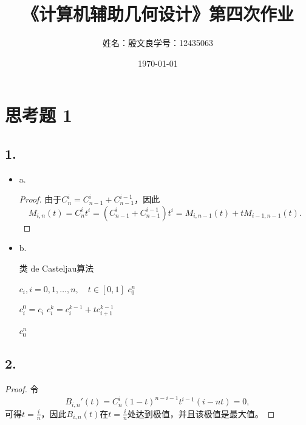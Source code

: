 \documentclass[utf8]{ctexart}
\title{《计算机辅助几何设计》第四次作业}
\author{姓名：殷文良\qquad 学号：12435063}
\date{\today}
\begin{document}
\maketitle
{}

\section*{思考题 1}
\subsection*{1.}
\begin{itemize}
    \item a.
    \begin{proof}
        由于$C_n^i = C_{n-1}^i + C_{n-1}^{i-1}$，因此
        \begin{equation*}
            M_{i,n}(t) = C_n^it^i
            = (C_{n-1}^i + C_{n-1}^{i-1})t^i
            = M_{i,n-1}(t) + tM_{i-1,n-1}(t).
        \end{equation*}
    \end{proof}
    \item b.
    \begin{algorithm}[H]
        \caption{类 de Casteljau算法}
        \label{alg1}
        \renewcommand{\algorithmicrequire}{\textbf{Input:}}
        \renewcommand{\algorithmicensure}{\textbf{Output:}}
        \begin{algorithmic}[1]
            \REQUIRE $c_i,i=0,1,\dots,n,\quad t\in[0,1]$
            \ENSURE $c_0^n$

            \STATE $c_i^0=c_i$
            \ENDFOR
            \STATE $c_i^k = c_{i}^{k-1} + tc_{i+1}^{k-1}$
            \ENDFOR
            \ENDFOR

            \RETURN $c_0^n$
        \end{algorithmic}
    \end{algorithm}
\end{itemize}

\subsection*{2.}
\begin{proof}
    令
    \begin{equation*}
        B_{i,n}'(t) = C_n^i(1-t)^{n-i-1}t^{i-1}(i-nt) = 0,
    \end{equation*}
    可得$t=\frac{i}{n}$，因此$B_{i,n}(t)$在$t=\frac{i}{n}$处达到极值，并且该极值是最大值。
\end{proof}
\end{document}
